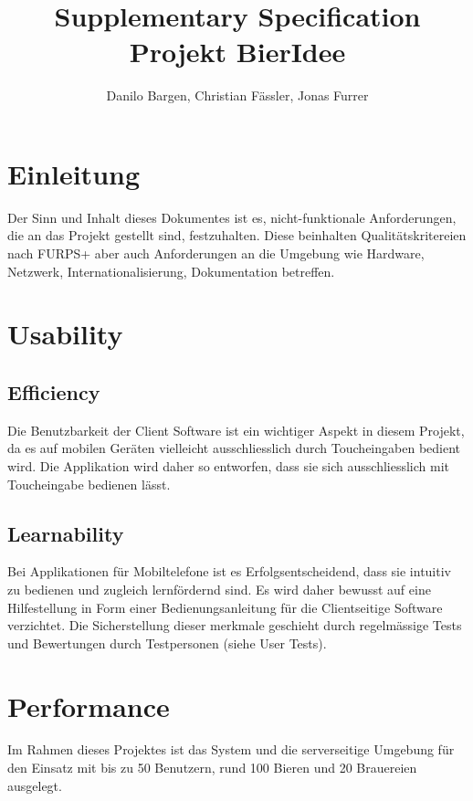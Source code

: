 \documentclass[10pt,a4paper]{scrartcl}
\author{Danilo Bargen, Christian Fässler, Jonas Furrer}
\title{Supplementary Specification \\Projekt BierIdee}
\subtitle{}
\begin{document}
\begin{titlepage}
	\maketitle
	\vspace{120mm}
	\thispagestyle{empty} %
\end{titlepage}



\section{Einleitung}

Der Sinn und Inhalt dieses Dokumentes ist es, nicht-funktionale Anforderungen, die an das Projekt gestellt sind, festzuhalten. Diese beinhalten Qualitätskritereien nach FURPS+ aber auch Anforderungen an die Umgebung wie Hardware, Netzwerk, Internationalisierung, Dokumentation betreffen.

\section{Usability}
\subsection{Efficiency}
Die Benutzbarkeit der Client Software ist ein wichtiger Aspekt in diesem Projekt, da es auf mobilen Geräten vielleicht ausschliesslich durch Toucheingaben bedient wird. Die Applikation wird daher so entworfen, dass sie sich ausschliesslich mit Toucheingabe bedienen lässt.
\subsection{Learnability}
Bei Applikationen für Mobiltelefone ist es Erfolgsentscheidend, dass sie intuitiv zu bedienen und zugleich lernfördernd sind. Es wird daher bewusst auf eine Hilfestellung in Form einer Bedienungsanleitung für die Clientseitige Software verzichtet. Die Sicherstellung dieser merkmale geschieht durch regelmässige Tests und Bewertungen durch Testpersonen (siehe User Tests).

\section{Performance}
Im Rahmen dieses Projektes ist das System und die serverseitige Umgebung für den Einsatz mit  bis zu 50 Benutzern, rund 100 Bieren und 20 Brauereien ausgelegt.
\end{document}
